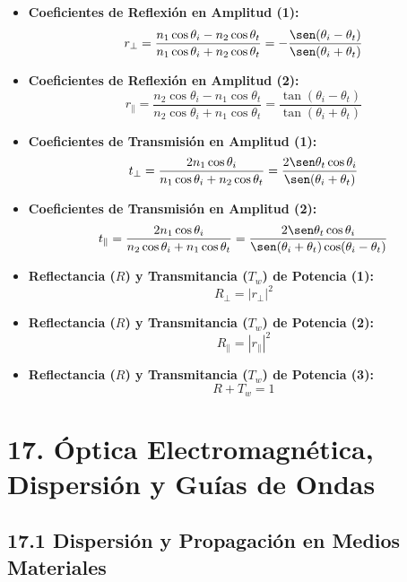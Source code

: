 \documentclass[11pt,a4paper]{article}
\begin{document}
\begin{itemize}
  \item \textbf{Coeficientes de Reflexión en Amplitud (1):}
  \[
    r_\perp = \frac{n_1 \cos\theta_i - n_2 \cos\theta_t}{n_1 \cos\theta_i + n_2 \cos\theta_t} = -\frac{\sen(\theta_i - \theta_t)}{\sen(\theta_i + \theta_t)}
  \]
  \item \textbf{Coeficientes de Reflexión en Amplitud (2):}
  \[
    r_\parallel = \frac{n_2 \cos\theta_i - n_1 \cos\theta_t}{n_2 \cos\theta_i + n_1 \cos\theta_t} = \frac{\tan(\theta_i - \theta_t)}{\tan(\theta_i + \theta_t)}
  \]
  \item \textbf{Coeficientes de Transmisión en Amplitud (1):}
  \[
    t_\perp = \frac{2 n_1 \cos\theta_i}{n_1 \cos\theta_i + n_2 \cos\theta_t} = \frac{2 \sen\theta_t \cos\theta_i}{\sen(\theta_i + \theta_t)}
  \]
  \item \textbf{Coeficientes de Transmisión en Amplitud (2):}
  \[
    t_\parallel = \frac{2 n_1 \cos\theta_i}{n_2 \cos\theta_i + n_1 \cos\theta_t} = \frac{2 \sen\theta_t \cos\theta_i}{\sen(\theta_i + \theta_t)\cos(\theta_i - \theta_t)}
  \]
  \item \textbf{Reflectancia ($R$) y Transmitancia ($T_w$) de Potencia (1):}
  \[
    R_\perp = |r_\perp|^2
  \]
  \item \textbf{Reflectancia ($R$) y Transmitancia ($T_w$) de Potencia (2):}
  \[
    R_\parallel = |r_\parallel|^2
  \]
  \item \textbf{Reflectancia ($R$) y Transmitancia ($T_w$) de Potencia (3):}
  \[
    R + T_w = 1
  \]
\end{itemize}

\section*{17. Óptica Electromagnética, Dispersión y Guías de Ondas}

\subsection*{17.1 Dispersión y Propagación en Medios Materiales}
\end{document}
